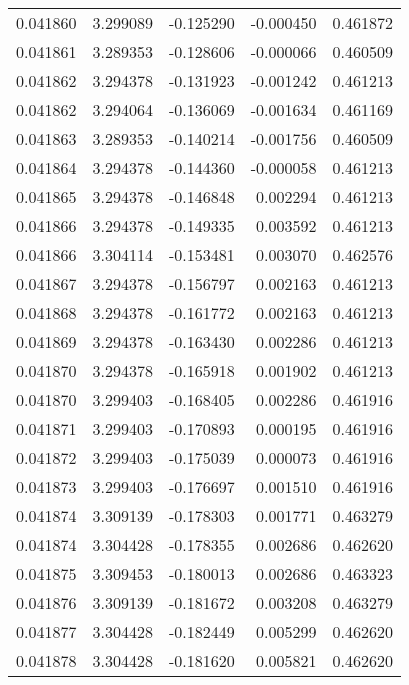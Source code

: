 \begin{tabular}{lrrrr}
0.041860    &  3.299089 & -0.125290 & -0.000450 &             0.461872 \\
0.041861    &  3.289353 & -0.128606 & -0.000066 &             0.460509 \\
0.041862    &  3.294378 & -0.131923 & -0.001242 &             0.461213 \\
0.041862    &  3.294064 & -0.136069 & -0.001634 &             0.461169 \\
0.041863    &  3.289353 & -0.140214 & -0.001756 &             0.460509 \\
0.041864    &  3.294378 & -0.144360 & -0.000058 &             0.461213 \\
0.041865    &  3.294378 & -0.146848 &  0.002294 &             0.461213 \\
0.041866    &  3.294378 & -0.149335 &  0.003592 &             0.461213 \\
0.041866    &  3.304114 & -0.153481 &  0.003070 &             0.462576 \\
0.041867    &  3.294378 & -0.156797 &  0.002163 &             0.461213 \\
0.041868    &  3.294378 & -0.161772 &  0.002163 &             0.461213 \\
0.041869    &  3.294378 & -0.163430 &  0.002286 &             0.461213 \\
0.041870    &  3.294378 & -0.165918 &  0.001902 &             0.461213 \\
0.041870    &  3.299403 & -0.168405 &  0.002286 &             0.461916 \\
0.041871    &  3.299403 & -0.170893 &  0.000195 &             0.461916 \\
0.041872    &  3.299403 & -0.175039 &  0.000073 &             0.461916 \\
0.041873    &  3.299403 & -0.176697 &  0.001510 &             0.461916 \\
0.041874    &  3.309139 & -0.178303 &  0.001771 &             0.463279 \\
0.041874    &  3.304428 & -0.178355 &  0.002686 &             0.462620 \\
0.041875    &  3.309453 & -0.180013 &  0.002686 &             0.463323 \\
0.041876    &  3.309139 & -0.181672 &  0.003208 &             0.463279 \\
0.041877    &  3.304428 & -0.182449 &  0.005299 &             0.462620 \\
0.041878    &  3.304428 & -0.181620 &  0.005821 &             0.462620 \\

\end{tabular}
